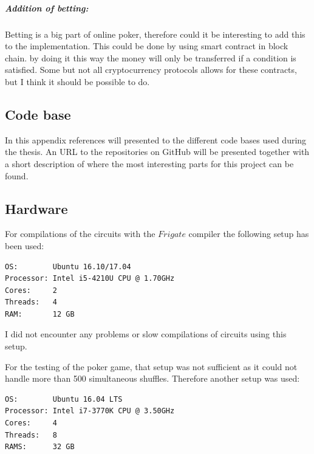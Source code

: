 \documentclass[twoside,11pt,openright]{report}
\begin{document}
\paragraph{Addition of betting:}
Betting is a big part of online poker, therefore could it be interesting to add this to the implementation. This could be done by using smart contract in block chain. by doing it this way the money will only be transferred if a condition is satisfied. Some but not all cryptocurrency protocols allows for these contracts, but I think it should be possible to do.



\begin{appendices}
\chapter{Code base}
In this appendix references will presented to the different code bases used during the thesis. An URL to the repositories on GitHub will be presented together with a short description of where the most interesting parts for this project can be found.

\section{Hardware}
\label{app:hardware}
For compilations of the circuits with the $Frigate$ compiler the following setup has been used:

\begin{center}
\begin{verbatim}
OS:        Ubuntu 16.10/17.04
Processor: Intel i5-4210U CPU @ 1.70GHz
Cores:     2
Threads:   4
RAM:       12 GB
\end{verbatim}
\end{center}

I did not encounter any problems or slow compilations of circuits using this setup.

\bigskip
For the testing of the poker game, that setup was not sufficient as it could not handle more than 500 simultaneous shuffles. Therefore another setup was used:

\begin{center}
\begin{verbatim}
OS:        Ubuntu 16.04 LTS
Processor: Intel i7-3770K CPU @ 3.50GHz
Cores:     4
Threads:   8
RAMS:      32 GB
\end{verbatim}
\end{center}


\end{appendices}
\end{document}
